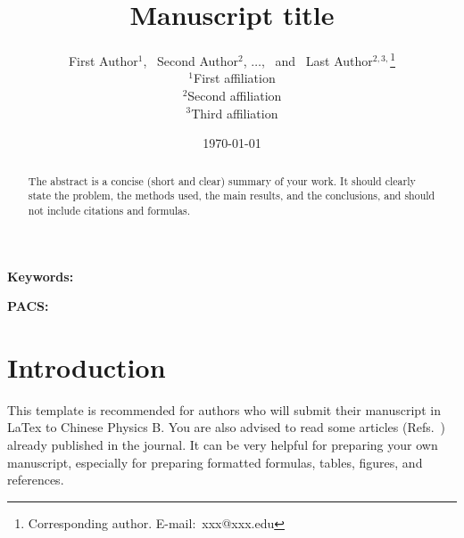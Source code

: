 \documentclass{cpbtex}
\begin{document}
\begin{CJK*}{GBK}{song}

\title{Manuscript title}


\author{First Author$^{1}$, \ Second Author$^{2}$, $\ldots$, \ and \ Last Author$^{2,3,}$\thanks{Corresponding author. E-mail:~xxx@xxx.edu}\\
$^{1}${First affiliation}\\  %
$^{2}${Second affiliation}\\ %
$^{3}${Third affiliation}}   %


\date{\today}
\maketitle

\begin{abstract}
The abstract is a concise (short and clear) summary of your work. It should clearly state the problem, the methods used, the main results, and the conclusions, and should not include citations and formulas.
\end{abstract}

\textbf{Keywords:} %

\textbf{PACS:} %


\section{Introduction}
This template is recommended for authors who will submit their manuscript in LaTex to Chinese Physics B. You are also advised to read some articles (Refs.~\cite{2,3,4,5,6}) already published in the journal. It can be very helpful for preparing your own manuscript, especially for preparing formatted formulas, tables, figures, and references.


\end{CJK*}
\end{document}
